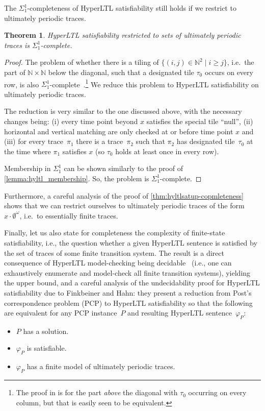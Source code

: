 \documentclass[dvipsnames,10pt,a4paper]{amsart}
\newtheorem{thm}{Theorem}[section]
\theoremstyle{definition}
\theoremstyle{remark}
\newcommand{\hyltl}{{HyperLTL}\xspace}
\begin{document}
The $\Sigma^1_1$-completeness of \hyltl satisfiability still holds if we restrict to ultimately periodic traces.


\begin{thm}
\label{thm:hyltlsatup-copmleteness}
  \hyltl satisfiability restricted to sets of ultimately periodic traces is $\Sigma^1_1$-complete.
\end{thm}


\begin{proof}
The problem of whether there is a tiling of $\{(i,j)\in \mathbb{N}^2\mid i\geq j\}$, i.e.\ the part of $\mathbb{N}\times\mathbb{N}$ below the diagonal, such that a designated tile $\tau_0$ occurs on every row, is also $\Sigma_1^1$-complete~\cite{Harel85}.\footnote{The proof in \cite{Harel85} is for the part \emph{above} the diagonal with $\tau_0$ occurring on every column, but that is easily seen to be equivalent.} We reduce this problem to \hyltl satisfiability on ultimately periodic traces.

The reduction is very similar to the one discussed above, with the necessary changes being: (i) every time point beyond $x$ satisfies the special tile ``null'', (ii) horizontal and vertical matching are only checked at or before time point $x$ and (iii) for every trace~$\pi_1$ there is a trace~$\pi_2$ such that $\pi_2$ has designated tile~$\tau_0$ at the time where $\pi_1$ satisfies $x$ (so $\tau_0$ holds at least once in every row).

Membership in $\Sigma_1^1$ can be shown similarly to the proof of \autoref{lemma:hyltl_membership}. So, the problem is $\Sigma^1_1$-complete.
\end{proof}


Furthermore, a careful analysis of the proof of \autoref{thm:hyltlsatup-copmleteness} shows that we can restrict ourselves to ultimately periodic traces of the form~$x\cdot\emptyset^\omega$, i.e.\ to essentially finite traces.

Finally, let us also state for completeness the complexity of finite-state satisfiability, i.e., the question whether a given \hyltl sentence is satisfied by the set of traces of some finite transition system.
The result is a direct consequence of \hyltl model-checking being decidable~\cite{FinkbeinerRS15} (i.e., one can exhaustively enumerate and model-check all finite transition systems), yielding the upper bound, and a careful analysis of the undecidability proof for \hyltl satisfiability due to Finkbeiner and Hahn: they present a reduction from Post's correspondence problem (PCP) to \hyltl satisfiability so that the following are equivalent for any PCP instance~$P$ and resulting \hyltl sentence~$\varphi_P$:
\begin{itemize}
    \item $P$ has a solution.
    \item $\varphi_P$ is satisfiable.
    \item $\varphi_P$ has a finite model of ultimately periodic traces.
\end{itemize}
\end{document}
